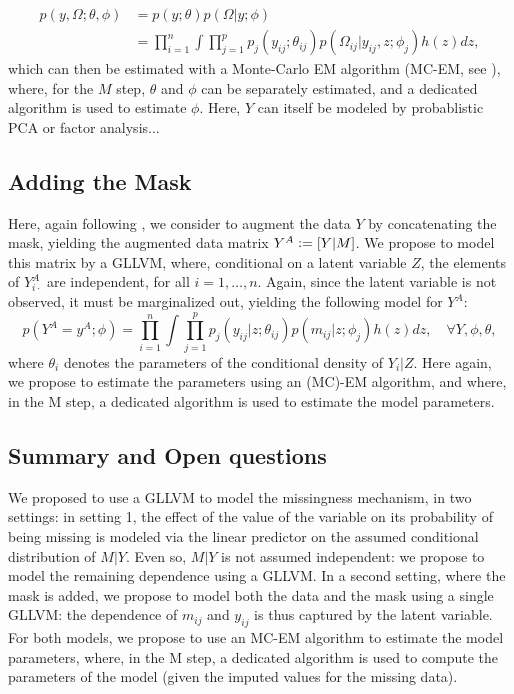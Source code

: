 \documentclass{article}
\begin{document}
\begin{align}
    p(y, \Omega;\theta, \phi) &= p(y; \theta) p(\Omega|y; \phi)\\
    &= \prod_{i=1}^n \int \prod_{j=1}^p p_j(y_{ij}; \theta_{ij})p(\Omega_{ij} | y_{ij}, z; \phi_j) h(z) dz,
\end{align}
%
which can then be estimated with a Monte-Carlo EM algorithm (MC-EM, see \cite{sportisse_imputation_2020}), where, for the $M$ step, $\theta$ and $\phi$ can be separately estimated, and a dedicated algorithm is used to estimate $\phi$. Here, $Y$ can itself be modeled by probablistic PCA or factor analysis...

\subsection{Adding the Mask}
Here, again following \textcite{sportisse_imputation_2020}, we consider to augment the data $Y$ by concatenating the mask, yielding the augmented data matrix $Y^A \vcentcolon =[Y|M]$. We propose to model this matrix by a GLLVM, where, conditional on a latent variable $Z$, the elements of $Y^A_{i\cdot}$ are independent, for all $i=1, \dots, n$. Again, since the latent variable is not observed, it must be marginalized out, yielding the following model for $Y^A$:
%
\begin{equation}
    p(Y^A = y^A; \phi) = \prod_{i=1}^n \int \prod_{j=1}^p p_j(y_{ij} |z; \theta_{ij}) p(m_{ij} |z; \phi_j) h(z) dz, \quad \forall Y, \phi, \theta,
\end{equation}
%
where $\theta_i$ denotes the parameters of the conditional density of $Y_i|Z$. Here again, we propose to estimate the parameters using an (MC)-EM algorithm, and where, in the M step, a dedicated algorithm is used to estimate the model parameters.

\subsection{Summary and Open questions}
We proposed to use a GLLVM to model the missingness mechanism, in two settings: in setting 1, the effect of the value of the variable on its probability of being missing is modeled via the linear predictor on the assumed conditional distribution of $M|Y$. Even so, $M|Y$ is not assumed independent: we propose to model the remaining dependence using a GLLVM. In a second setting, where the mask is added, we propose to model both the data and the mask using a single GLLVM: the dependence of $m_{ij}$ and $y_{ij}$ is thus captured by the latent variable. For both models, we propose to use an MC-EM algorithm to estimate the model parameters, where, in the M step, a dedicated algorithm is used to compute the parameters of the model (given the imputed values for the missing data).
\end{document}
